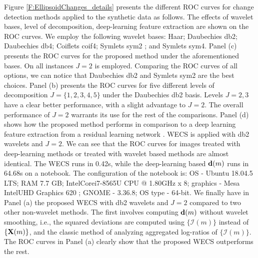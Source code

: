\documentclass[journal]{IEEEtran}
\newcommand{\vd}{{\textbf d}}
\newcommand{\vX}{{\textbf X}}
\begin{document}
Figure \ref{F:EllipsoidChanges_details} presents the different ROC curves for change detection methods applied to the synthetic data as follows. The effects of wavelet bases, level of decomposition, deep-learning feature extraction are shown on the ROC curves. We employ the following wavelet bases: Haar;  Daubechies db2; Daubechies db4; Coiflets coif4; Symlets sym2 ; and Symlets sym4. Panel (c) presents the ROC curves for the proposed method under the aforementioned bases. On all instances $J=2$ is employed. Comparing the ROC curves of all options, we can notice that Daubechies db2 and Symlets sym2 are the best choices.  Panel (b) presents the ROC curves for five different levels of decomposition $J=\{1,2,3,4,5\}$ under the Daubechies db2 basis. Levels $J=2,3$ have a clear better performance, with a slight advantage to $J=2$. The overall performance  of $J=2$ warrants its use for the rest of the comparisons. Panel (d) shows how the proposed method performs in comparison to a deep learning feature extraction from a residual learning network \cite{zhang2017beyond}. WECS is applied with db2 wavelets and $J=2$. We can see that the ROC curves for images treated with deep-learning methods or treated with wavelet based methods are almost identical. The WECS runs in 0.42s, while the deep-learning based $\vd(m)$ runs in 64.68s on a notebook. The configuration of the notebook is: OS - Ubuntu 18.04.5 LTS; RAM 7.7 GB; Intel\textregistered Core\texttrademark $ $i7-8565U CPU @ 1.80GHz x 8; graphics - Mesa Intel\texttrademark UHD Graphics 620 ; GNOME - 3.36.8; OS type - 64-bit. We finally have in Panel (a) the proposed WECS with db2 wavelets and $J=2$ compared to two other non-wavelet methods. The first involves computing $\vd(m)$ without wavelet smoothing, i.e., the squared deviations are computed using $\{\mathcal{I}(m)\}$ instead of $\{\vX(m)\}$, and the classic method of analyzing aggregated log-ratios of $\{\mathcal{I}(m)\}$. The ROC curves in Panel (a) clearly show that  the proposed WECS outperforms the rest. 

\end{document}

